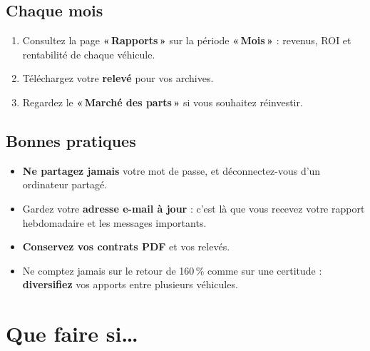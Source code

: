 \documentclass[11pt,a4paper]{article}
\newcommand{\Needspace}[1]{\par\ifdim\pagegoal<\maxdimen\ifdim\dimexpr\pagegoal-\pagetotal\relax<#1\relax\newpage\fi\fi}
\newcommand{\bouton}[1]{\textbf{«\,#1\,»}}
\let\oldsubsection\subsection
\renewcommand{\subsection}{\Needspace{5.5cm}\oldsubsection}
\let\oldsection\section
\renewcommand{\section}{\clearpage\oldsection}
\begin{document}
\subsection{Chaque mois}
\begin{enumerate}
  \item Consultez la page \bouton{Rapports} sur la période \bouton{Mois} : revenus, ROI et rentabilité de chaque véhicule.
  \item Téléchargez votre \textbf{relevé} pour vos archives.
  \item Regardez le \bouton{Marché des parts} si vous souhaitez réinvestir.
\end{enumerate}

\subsection{Bonnes pratiques}
\begin{itemize}
  \item \textbf{Ne partagez jamais} votre mot de passe, et déconnectez-vous d'un ordinateur partagé.
  \item Gardez votre \textbf{adresse e-mail à jour} : c'est là que vous recevez votre rapport hebdomadaire et les messages importants.
  \item \textbf{Conservez vos contrats PDF} et vos relevés.
  \item Ne comptez jamais sur le retour de 160\,\% comme sur une certitude : \textbf{diversifiez} vos apports entre plusieurs véhicules.
\end{itemize}

\section{Que faire si\ldots}
\end{document}
